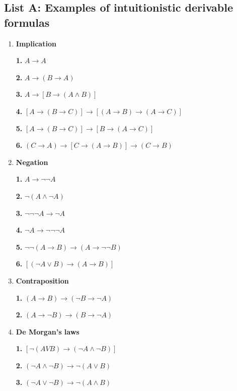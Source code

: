 \documentclass[12pt]{article}
\begin{document}
\subsection{List A: Examples of intuitionistic derivable formulas}

\begin{enumerate}
\item \textbf{Implication}

\textbf{1.} $A \rightarrow A$

\textbf{2.} $A \rightarrow (B \rightarrow A)$

\textbf{3.} $A \rightarrow [ B \rightarrow (A \wedge B)]$

\textbf{4.} $[A \rightarrow (B \rightarrow C)] \rightarrow [(A \rightarrow B) \rightarrow (A \rightarrow C)]$

\textbf{5.} $[ A \rightarrow (B \rightarrow C)] \rightarrow [B \rightarrow (A \rightarrow C)]$

\textbf{6.} ${(C \rightarrow A) \rightarrow [C \rightarrow (A \rightarrow B)] \rightarrow (C \rightarrow B)}$
                                   
\item \textbf{Negation}

\textbf{1.} $A \rightarrow \neg \neg A$

\textbf{2.} $\neg (A \wedge \neg A)$

\textbf{3.} $\neg \neg \neg A \rightarrow \neg A$

\textbf{4.} $\neg A \rightarrow \neg \neg \neg A$

\textbf{5.} $\neg \neg (A \rightarrow B) \rightarrow (A \rightarrow \neg \neg B)$
 
\textbf{6.} $[(\neg A \vee B) \rightarrow (A \rightarrow B)]$

\item \textbf{Contraposition}

\textbf{1.} $(A \rightarrow B) \rightarrow (\neg B \rightarrow \neg A)$
 
\textbf{2.} $(A \rightarrow \neg B) \rightarrow (B \rightarrow \neg A)$

\item \textbf{De Morgan's laws}

\textbf{1.} $[\neg (A V B) \rightarrow (\neg A \wedge \neg B)]$
 
\textbf{2.} $(\neg A \wedge \neg B) \rightarrow \neg (A \vee B)$
 
\textbf{3.} $(\neg A \vee \neg B) \rightarrow \neg (A \wedge B)$
\end{enumerate}
\end{document}
